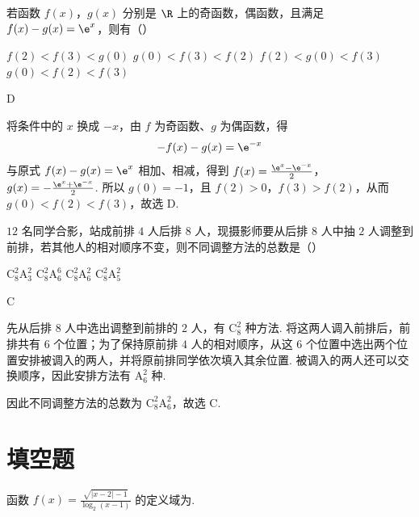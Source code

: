 \begin{problem}
若函数 \(f(x)\)，\(g(x)\) 分别是 \( \R \) 上的奇函数，偶函数，且满足 \( f(x) - g(x) = \e^{x} \)，则有（\quad）

\choices
    {\(f(2) < f(3) < g(0)\)}
    {\(g(0) < f(3) < f(2)\)}
    {\(f(2) < g(0) < f(3)\)}
    {\(g(0) < f(2) < f(3)\)}
\end{problem}

\begin{answer}
D
\end{answer}

\begin{solution}
将条件中的 \(x\) 换成 \(-x\)，由 \(f\) 为奇函数、\(g\) 为偶函数，得
\[
-f(x)-g(x)=\e^{-x}
\]
与原式 \(f(x)-g(x)=\e^x\) 相加、相减，得到
\(f(x)=\frac{\e^x-\e^{-x}}{2}\)，\(g(x)=-\frac{\e^x+\e^{-x}}{2}\).
所以 \(g(0)=-1\)，且 \(f(2)>0\)，\(f(3)>f(2)\)，从而 \(g(0)<f(2)<f(3)\)，故选 D.
\end{solution}

\begin{problem}
\(12\) 名同学合影，站成前排 \(4\) 人后排 \(8\) 人，现摄影师要从后排 \(8\) 人中抽 \(2\) 人调整到前排，若其他人的相对顺序不变，则不同调整方法的总数是（\quad）

\choices
    {\(\mathrm{C}_8^2\mathrm{A}_3^2\)}
    {\(\mathrm{C}_8^2\mathrm{A}_6^6\)}
    {\(\mathrm{C}_8^2\mathrm{A}_6^2\)}
    {\(\mathrm{C}_8^2\mathrm{A}_5^2\)}
\end{problem}

\begin{answer}
C
\end{answer}

\begin{solution}
先从后排 \(8\) 人中选出调整到前排的 \(2\) 人，有 \(\mathrm{C}_8^2\) 种方法. 将这两人调入前排后，前排共有 \(6\) 个位置；为了保持原前排 \(4\) 人的相对顺序，从这 \(6\) 个位置中选出两个位置安排被调入的两人，并将原前排同学依次填入其余位置. 被调入的两人还可以交换顺序，因此安排方法有 \(\mathrm{A}_6^2\) 种.

因此不同调整方法的总数为 \(\mathrm{C}_8^2\mathrm{A}_6^2\)，故选 C.
\end{solution}

\section{填空题}

\begin{problem}
函数 \( f(x) = \frac{\sqrt{|x - 2| - 1}}{\log_2(x - 1)} \) 的定义域为\fillinblank{}.
\end{problem}

